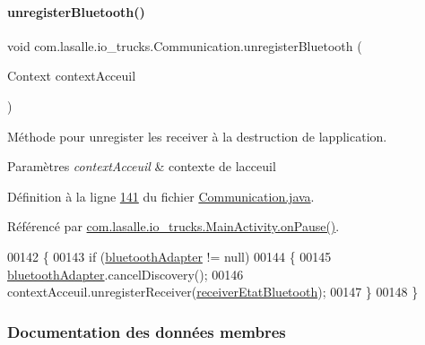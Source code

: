 \paragraph{\texorpdfstring{unregister\+Bluetooth()}{unregisterBluetooth()}}
{\footnotesize\ttfamily void com.\+lasalle.\+io\+\_\+trucks.\+Communication.\+unregister\+Bluetooth (\begin{DoxyParamCaption}\item[{Context}]{context\+Acceuil }\end{DoxyParamCaption})}



Méthode pour unregister les receiver à la destruction de l\textquotesingle{}application. 


\begin{DoxyParams}{Paramètres}
{\em context\+Acceuil} & contexte de l\textquotesingle{}acceuil \\
\hline
\end{DoxyParams}


Définition à la ligne \hyperlink{_communication_8java_source_l00141}{141} du fichier \hyperlink{_communication_8java_source}{Communication.\+java}.



Référencé par \hyperlink{_main_activity_8java_source_l00096}{com.\+lasalle.\+io\+\_\+trucks.\+Main\+Activity.\+on\+Pause()}.


\begin{DoxyCode}
00142     \{
00143         \textcolor{keywordflow}{if} (\hyperlink{classcom_1_1lasalle_1_1io__trucks_1_1_communication_aab37c21038f7b794ab77e6705b8b5938}{bluetoothAdapter} != null)
00144         \{
00145             \hyperlink{classcom_1_1lasalle_1_1io__trucks_1_1_communication_aab37c21038f7b794ab77e6705b8b5938}{bluetoothAdapter}.cancelDiscovery();
00146             contextAcceuil.unregisterReceiver(\hyperlink{classcom_1_1lasalle_1_1io__trucks_1_1_communication_a4a45e2d6f9b84afa60b4a28b52f5a4bf}{receiverEtatBluetooth});
00147         \}
00148     \}
\end{DoxyCode}


\subsubsection{Documentation des données membres}
\mbox{\label{classcom_1_1lasalle_1_1io__trucks_1_1_communication_aab37c21038f7b794ab77e6705b8b5938}} 
